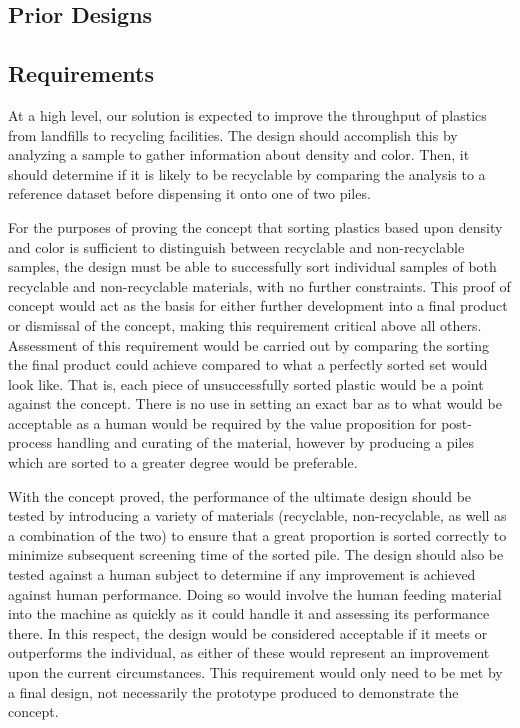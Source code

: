 \documentclass[12pt]{article}
\begin{document}
\begin{multicols*}{2}
        \subsection{Prior Designs}

        \subsection{Requirements}
            At a high level, our solution is expected to improve the throughput of plastics from landfills to recycling facilities. The design should accomplish this by analyzing a sample to gather information about density and color. Then, it should determine if it is likely to be recyclable by comparing the analysis to a reference dataset before dispensing it onto one of two piles. 

            For the purposes of proving the concept that sorting plastics based upon density and color is sufficient to distinguish between recyclable and non-recyclable samples, the design must be able to successfully sort individual samples of both recyclable and non-recyclable materials, with no further constraints. This proof of concept would act as the basis for either further development into a final product or dismissal of the concept, making this requirement critical above all others. Assessment of this requirement would be carried out by comparing the sorting the final product could achieve compared to what a perfectly sorted set would look like. That is, each piece of unsuccessfully sorted plastic would be a point against the concept. There is no use in setting an exact bar as to what would be acceptable as a human would be required by the value proposition for post-process handling and curating of the material, however by producing a piles which are sorted to a greater degree would be preferable.  

            With the concept proved, the performance of the ultimate design should be tested by introducing a variety of materials (recyclable, non-recyclable, as well as a combination of the two) to ensure that a great proportion is sorted correctly to minimize subsequent screening time of the sorted pile. The design should also be tested against a human subject to determine if any improvement is achieved against human performance. Doing so would involve the human feeding material into the machine as quickly as it could handle it and assessing its performance there. In this respect, the design would be considered acceptable if it meets or outperforms the individual, as either of these would represent an improvement upon the current circumstances. This requirement would only need to be met by a final design, not necessarily the prototype produced to demonstrate the concept. 


\end{multicols*}
\end{document}
